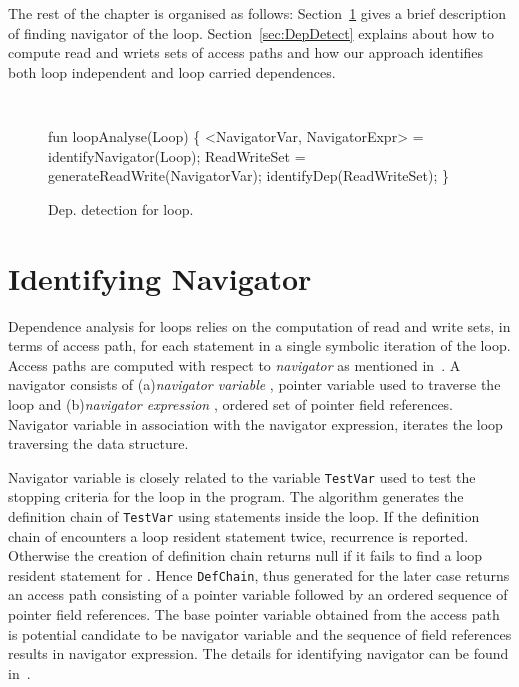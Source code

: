The rest of the 
chapter is organised as follows: Section~\ref{sec:nav} gives a
brief description of finding navigator of the loop. Section~\ref{sec:DepDetect} 
explains about how to compute read and wriets sets of access 
paths and how our approach identifies both loop independent and
loop carried dependences.
\begin{figure}
\begin{framed}
{\tt
  \begin{program}{0}
  \FL fun loopAnalyse(Loop)  \{
   <NavigatorVar, NavigatorExpr>  = identifyNavigator(Loop);%
   ReadWriteSet = generateReadWrite(NavigatorVar);
   identifyDep(ReadWriteSet);
   \}
  \end{program}
}
\end{framed}
  \caption{Dep. detection for loop. \label{fig:algoLoopAnalyse}}
\end{figure}
\section{Identifying Navigator}
\label{sec:nav}
Dependence analysis for loops relies on the computation of read and write sets, 
in terms of access path, for each statement in a single symbolic iteration of the loop. 
Access paths are computed with respect to \emph{navigator} as mentioned 
in~\cite{ghiya98detecting}. A navigator consists of (a)\emph{navigator variable} , pointer variable 
used to traverse the loop and (b)\emph{navigator expression} , ordered set of pointer field references. 
Navigator variable in association with the navigator expression, iterates the loop traversing the data structure.

Navigator variable is closely related to the variable {\tt TestVar} used to test the stopping criteria
for the loop in the program. The algorithm generates the definition chain  of 
{\tt TestVar} using statements inside the loop. If the definition chain of  encounters a 
loop resident statement twice, recurrence is reported. Otherwise the creation of definition chain returns 
null if it fails to find a loop resident statement for . 
Hence {\tt DefChain}, thus generated for the 
later case returns an access path consisting of a pointer variable followed by an ordered sequence of pointer field references. 
The base pointer variable obtained from the access path is potential candidate to be navigator variable and the  
sequence of field references results in navigator expression. The details for identifying navigator can be found 
in~\cite{ghiya98detecting}. 

